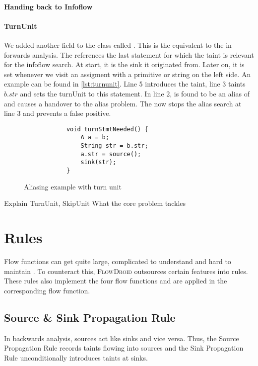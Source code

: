 \documentclass[../draft.tex]{subfiles}
\begin{document}
    \paragraph{Handing back to Infoflow}

    \paragraph{TurnUnit} 
    We added another field to the  class called . This is the equivalent to the  in forwards analysis. The  references the last statement for which the taint is relevant for the infoflow search. At start, it is the sink it originated from. Later on, it is set whenever we visit an assigment with a primitive or string on the left side. An example can be found in \autoref{lst:turnunit}. Line 5 introduces the taint, line 3 taints $b.str$ and sets the turnUnit to this statement. In line 2,  is found to be an alias of  and causes a handover to the alias problem. The  now stops the alias search at line 3 and prevents a false positive.

    \begin{figure}[ht]
        \centering
        \begin{lstlisting}
            void turnStmtNeeded() {
                A a = b;
                String str = b.str;
                a.str = source();
                sink(str);
            }
        \end{lstlisting}
        \caption{Aliasing example with turn unit}
        \label{lst:turnunit}
    \end{figure}


    Explain TurnUnit, SkipUnit
    What the core problem tackles

    \section{Rules}
    Flow functions can get quite large, complicated to understand and hard to maintain \cite{Lerch2015}. To counteract this, \textsc{FlowDroid} outsources certain features into rules. These rules also implement the four flow functions and are applied in the corresponding flow function.

    \subsection{Source \& Sink Propagation Rule}\label{s:sourcerule}
    In backwards analysis, sources act like sinks and vice versa. Thus, the Source Propagation Rule records taints flowing into sources and the Sink Propagation Rule unconditionally introduces taints at sinks.
\end{document}
